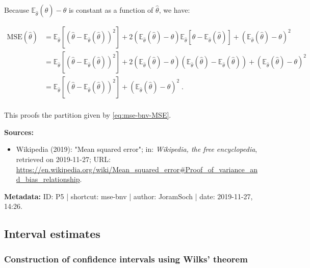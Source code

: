 \documentclass[a4paper,12pt]{book}
\begin{document}
Because $\mathbb{E}_{\hat{\theta}}(\hat{\theta}) - \theta$ is constant as a function of $\hat{\theta}$, we have:

\begin{equation} \label{eq:mse-bnv-MSE-ref2}
\begin{split}
\mathrm{MSE}(\hat{\theta}) &= \mathbb{E}_{\hat{\theta}}\left[ \left( \hat{\theta} - \mathbb{E}_{\hat{\theta}}(\hat{\theta}) \right)^2 \right] + 2  \left( \mathbb{E}_{\hat{\theta}}(\hat{\theta}) - \theta \right) \mathbb{E}_{\hat{\theta}}\left[ \hat{\theta} - \mathbb{E}_{\hat{\theta}}(\hat{\theta}) \right] + \left( \mathbb{E}_{\hat{\theta}}(\hat{\theta}) - \theta \right)^2 \\
&= \mathbb{E}_{\hat{\theta}}\left[ \left( \hat{\theta} - \mathbb{E}_{\hat{\theta}}(\hat{\theta}) \right)^2 \right] + 2  \left( \mathbb{E}_{\hat{\theta}}(\hat{\theta}) - \theta \right) \left( \mathbb{E}_{\hat{\theta}}(\hat{\theta}) - \mathbb{E}_{\hat{\theta}}(\hat{\theta}) \right) + \left( \mathbb{E}_{\hat{\theta}}(\hat{\theta}) - \theta \right)^2 \\
&= \mathbb{E}_{\hat{\theta}}\left[ \left( \hat{\theta} - \mathbb{E}_{\hat{\theta}}(\hat{\theta}) \right)^2 \right] + \left( \mathbb{E}_{\hat{\theta}}(\hat{\theta}) - \theta \right)^2 \; . \\
\end{split}
\end{equation}

This proofs the partition given by \eqref{eq:mse-bnv-MSE}.

\vspace{1em}
\textbf{Sources:}
\begin{itemize}
\item Wikipedia (2019): "Mean squared error"; in: \textit{Wikipedia, the free encyclopedia}, retrieved on 2019-11-27; URL: \url{https://en.wikipedia.org/wiki/Mean_squared_error#Proof_of_variance_and_bias_relationship}.
\end{itemize}


\vspace{1em}
\textbf{Metadata:} ID: P5 | shortcut: mse-bnv | author: JoramSoch | date: 2019-11-27, 14:26.


\subsection{Interval estimates}

\subsubsection[\textbf{Construction of confidence intervals using Wilks' theorem}]{Construction of confidence intervals using Wilks' theorem} \label{sec:ci-wilks}
\end{document}
